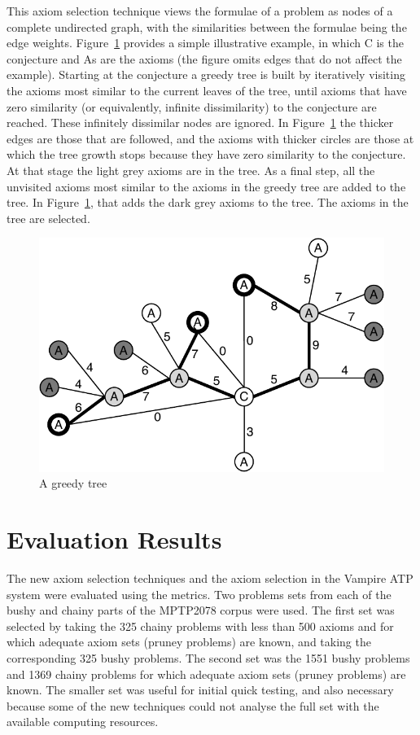 \documentclass[EPiC]{easychair}
\begin{document}
This axiom selection technique views the formulae of a problem as nodes
of a complete undirected graph, with the similarities between the formulae 
being the edge weights.
Figure~\ref{GreedyTree} provides a simple illustrative example, in which
{\sf C} is the conjecture and {\sf A}s are the axioms (the figure
omits edges that do not affect the example).
Starting at the conjecture a greedy tree is built by iteratively visiting the 
axioms most similar to the current leaves of the tree, until axioms that 
have zero similarity (or equivalently, infinite dissimilarity) 
to the conjecture are reached. 
These infinitely dissimilar nodes are ignored.
In Figure~\ref{GreedyTree} the thicker edges are those that are followed,
and the axioms with thicker circles are those at which the tree growth 
stops because they have zero similarity to the conjecture.
At that stage the light grey axioms are in the tree.
As a final step, all the unvisited axioms most similar to the axioms in the 
greedy tree are added to the tree.
In Figure~\ref{GreedyTree}, that adds the dark grey axioms to the tree.
The axioms in the tree are selected.

\begin{figure}[h]
\centering
\includegraphics[width=0.5\linewidth]{GreedyTree+NN.pdf}
\caption{A greedy tree}
\label{GreedyTree}
\end{figure}

\section{Evaluation Results}
\label{Results}

The new axiom selection techniques and the axiom selection in the Vampire 
ATP system were evaluated using the metrics.
Two problems sets from each of the bushy and chainy parts of the MPTP2078 
corpus were used. 
The first set was selected by taking the 325 chainy problems with less than 
500 axioms and for which adequate axiom sets (pruney problems) are known, 
and taking the corresponding 325 bushy problems.
The second set was the 1551 bushy problems and 1369 chainy problems for which
adequate axiom sets (pruney problems) are known.
The smaller set was useful for initial quick testing, and also necessary 
because some of the new techniques could not analyse the full set with the 
available computing resources.
\end{document}
